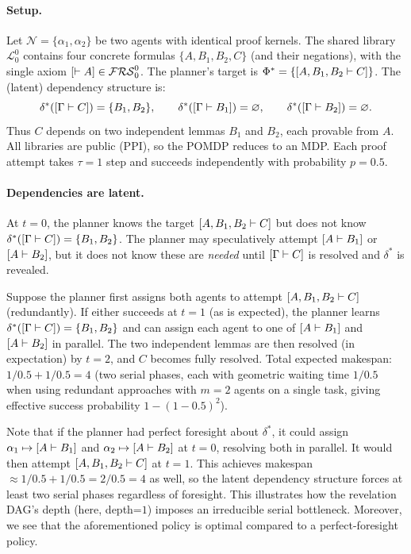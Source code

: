 \paragraph{Setup.} Let $\mathcal{N}=\{\alpha_1,\alpha_2\}$ be two agents with identical proof kernels. The shared library $\mathcal{L}^0_0$ contains four concrete formulas $\{A,B_1,B_2,C\}$ (and their negations), with the single axiom $[\vdash A]\in\mathcal{FRS}^0_0$. The planner's target is $\Phi^*=\{[A,B_1,B_2 \vdash C]\}$. The (latent) dependency structure is:
\[
\delta^*([\Gamma \vdash C]) = \{B_1,B_2\}, \qquad \delta^*([\Gamma \vdash B_1]) = \varnothing, \qquad \delta^*([\Gamma \vdash B_2]) = \varnothing.
\]
Thus $C$ depends on two independent lemmas $B_1$ and $B_2$, each provable from $A$. All libraries are public (PPI), so the POMDP reduces to an MDP. Each proof attempt takes $\tau=1$ step and succeeds independently with probability $p=0.5$.

\paragraph{Dependencies are latent.} At $t=0$, the planner knows the target $[A,B_1,B_2 \vdash C]$ but does not know $\delta^*([\Gamma \vdash C]) = \{B_1,B_2\}$. The planner may speculatively attempt $[A\vdash B_1]$ or $[A\vdash B_2]$, but it does not know these are \emph{needed} until $[\Gamma \vdash C]$ is resolved and $\delta^*$ is revealed.


Suppose the planner first assigns both agents to attempt $[A,B_1,B_2 \vdash C]$ (redundantly). If either succeeds at $t=1$ (as is expected), the planner learns $\delta^*([\Gamma \vdash C]) = \{B_1,B_2\}$ and can assign each agent to one of $[A\vdash B_1]$ and $[A\vdash B_2]$ in parallel. The two independent lemmas are then resolved (in expectation) by $t=2$, and $C$ becomes fully resolved. Total expected makespan: $1/0.5 + 1/0.5 = 4$ (two serial phases, each with geometric waiting time $1/0.5$ when using redundant approaches with $m=2$ agents on a single task, giving effective success probability $1-(1-0.5)^2$).


Note that if the planner had perfect foresight about $\delta^*$, it could assign $\alpha_1\mapsto [A\vdash B_1]$ and $\alpha_2\mapsto [A\vdash B_2]$ at $t=0$, resolving both in parallel. It would then attempt $[A,B_1,B_2 \vdash C]$ at $t=1$. This achieves makespan $\approx 1/0.5 + 1/0.5 = 2/0.5 = 4$ as well, so the latent dependency structure forces at least two serial phases regardless of foresight. This illustrates how the revelation DAG's depth (here, depth=$1$) imposes an irreducible serial bottleneck. Moreover, we see that the aforementioned policy is optimal compared to a perfect-foresight policy.


